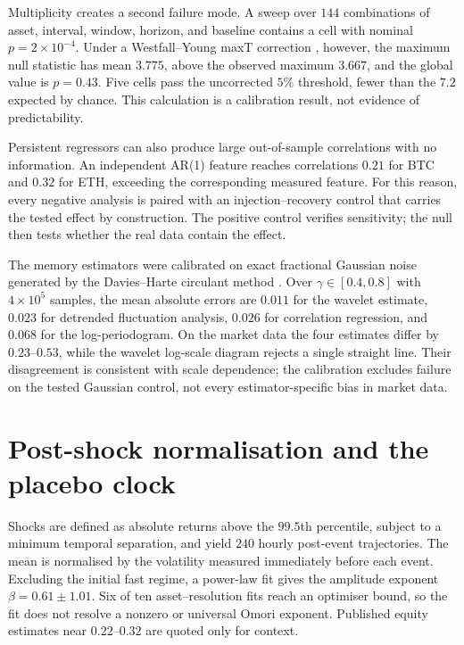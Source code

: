 \documentclass[aps,pre,onecolumn,superscriptaddress,floatfix,nofootinbib]{revtex4-2}
\begin{document}
Multiplicity creates a second failure mode. A sweep over $144$ combinations
of asset, interval, window, horizon, and baseline contains a cell with nominal
$p=2\times10^{-4}$. Under a Westfall--Young maxT correction
\cite{westfall1993}, however, the maximum null statistic has mean $3.775$, above
the observed maximum $3.667$, and the global value is $p=0.43$. Five cells pass
the uncorrected $5\%$ threshold, fewer than the $7.2$ expected by chance. This
calculation is a calibration result, not evidence of predictability.

Persistent regressors can also produce large out-of-sample correlations with
no information. An independent AR(1) feature reaches correlations $0.21$ for
BTC and $0.32$ for ETH, exceeding the corresponding measured feature. For this
reason, every negative analysis is paired with an injection--recovery control
that carries the tested effect by construction. The positive control verifies
sensitivity; the null then tests whether the real data contain the effect.

The memory estimators were calibrated on exact fractional Gaussian noise
generated by the Davies--Harte circulant method \cite{davies1987}. Over
$\gamma\in[0.4,0.8]$ with $4\times10^5$ samples, the mean absolute errors are
$0.011$ for the wavelet estimate, $0.023$ for detrended fluctuation analysis,
$0.026$ for correlation regression, and $0.068$ for the log-periodogram. On
the market data the four estimates differ by $0.23$--$0.53$, while the wavelet
log-scale diagram rejects a single straight line. Their disagreement is
consistent with scale dependence; the calibration excludes failure on the
tested Gaussian control, not every estimator-specific bias in market data.

\section{Post-shock normalisation and the placebo clock}

Shocks are defined as absolute returns above the $99.5$th percentile, subject
to a minimum temporal separation, and yield $240$ hourly post-event
trajectories. The mean is normalised by the volatility measured immediately
before each event. Excluding the initial fast regime, a power-law fit gives the
amplitude exponent $\beta=0.61\pm1.01$. Six of ten asset--resolution fits reach
an optimiser bound, so the fit does not resolve a nonzero or universal Omori
exponent. Published equity estimates near $0.22$--$0.32$
\cite{lillo2003,zawadowski2006} are quoted only for context.
\end{document}
